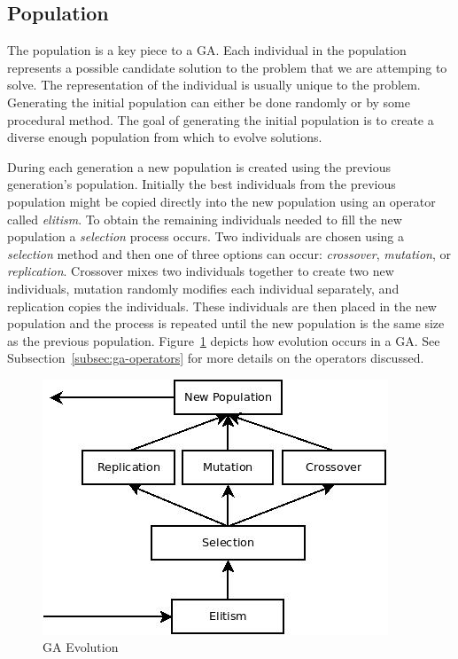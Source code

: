 \subsection{Population}

The population is a key piece to a GA. Each individual in the population represents a possible candidate solution to the problem that we are attemping to solve. The representation of the individual is usually unique to the problem. Generating the initial population can either be done randomly or by some procedural method. The goal of generating the initial population is to create a diverse enough population from which to evolve solutions.

During each generation a new population is created using the previous generation's population. Initially the best individuals from the previous population might be copied directly into the new population using an operator called \textit{elitism}. To obtain the remaining individuals needed to fill the new population a \textit{selection} process occurs. Two individuals are chosen using a \textit{selection} method and then one of three options can occur: \textit{crossover}, \textit{mutation}, or \textit{replication}. Crossover mixes two individuals together to create two new individuals, mutation randomly modifies each individual separately, and replication copies the individuals. These individuals are then placed in the new population and the process is repeated until the new population is the same size as the previous population. Figure~\ref{fig:gaFlowchart} depicts how evolution occurs in a GA. See Subsection~\ref{subsec:ga-operators} for more details on the operators discussed.

\begin{figure}[H]
	\centering
	\includegraphics[bb=0 0 288 390,scale=0.5]{figures/GA.jpeg}
	\caption{GA Evolution}
	\label{fig:gaFlowchart}
\end{figure}


